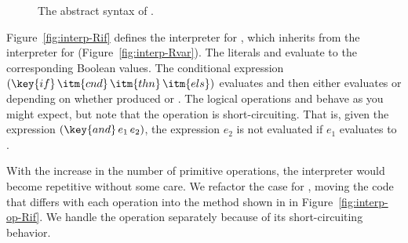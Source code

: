 \documentclass[11pt]{book}
\newcommand{\gray}[1]{{\color{gray} #1}}
\begin{document}
\begin{figure}[tp]
\centering
\fbox{
\begin{minipage}{0.96\textwidth}
\[
\begin{array}{lcl}
  \itm{bool} &::=& \code{\#t} \mid \code{\#f} \\
  \itm{cmp} &::= & \code{eq?} \mid \code{<} \mid \code{<=} \mid \code{>} \mid \code{>=} \\
  \itm{op} &::= & \itm{cmp} \mid \code{read} \mid \code{+} \mid \code{-}
    \mid \code{and} \mid \code{or} \mid \code{not} \\
  \Exp &::=& \gray{ \INT{\Int} \mid \VAR{\Var} \mid \LET{\Var}{\Exp}{\Exp} } \\
     &\mid& \PRIM{\itm{op}}{\Exp\ldots}\\
     &\mid& \BOOL{\itm{bool}} \mid \IF{\Exp}{\Exp}{\Exp} \\
  \LangIf{} &::=& \PROGRAM{\code{'()}}{\Exp}
\end{array}
\]
\end{minipage}
}
\caption{The abstract syntax of \LangIf{}.}
\label{fig:Rif-syntax}
\end{figure}

Figure~\ref{fig:interp-Rif} defines the interpreter for \LangIf{},
which inherits from the interpreter for \LangVar{}
(Figure~\ref{fig:interp-Rvar}). The literals  and 
evaluate to the corresponding Boolean values. The conditional
expression $(\key{if}\, \itm{cnd}\,\itm{thn}\,\itm{els})$ evaluates
 and then either evaluates  or  depending
on whether  produced  or . The logical
operations  and  behave as you might expect, but
note that the  operation is short-circuiting. That is, given
the expression $(\key{and}\,e_1\,e_2)$, the expression $e_2$ is not
evaluated if $e_1$ evaluates to .

With the increase in the number of primitive operations, the
interpreter would become repetitive without some care.  We refactor
the case for , moving the code that differs with each
operation into the  method shown in in
Figure~\ref{fig:interp-op-Rif}. We handle the  operation
separately because of its short-circuiting behavior.
\end{document}
